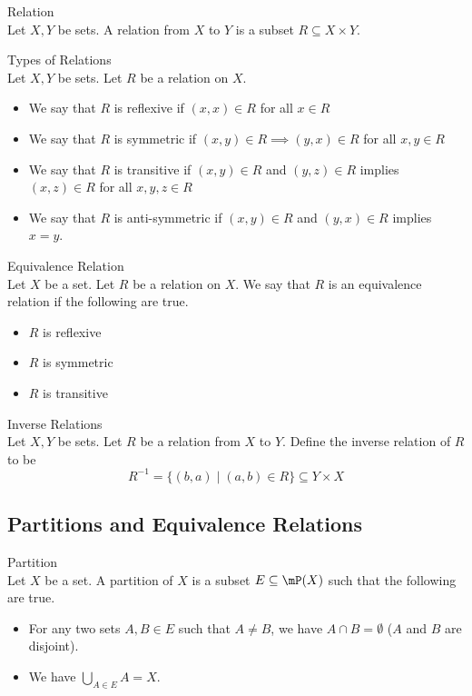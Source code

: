 \documentclass[a4paper]{article}
\begin{document}
\begin{defn}{Relation}{}\\
Let $X,Y$ be sets. A relation from $X$ to $Y$ is a subset $R\subseteq X\times Y$. 
\end{defn}

\begin{defn}{Types of Relations}{}\\
Let $X,Y$ be sets. Let $R$ be a relation on $X$. 
\begin{itemize}
\item We say that $R$ is reflexive if $(x,x)\in R$ for all $x\in R$
\item We say that $R$ is symmetric if $(x,y)\in R\implies (y,x)\in R$ for all $x,y\in R$
\item We say that $R$ is transitive if $(x,y)\in R$ and $(y,z)\in R$ implies $(x,z)\in R$ for all $x,y,z\in R$
\item We say that $R$ is anti-symmetric if $(x,y)\in R$ and $(y,x)\in R$ implies $x=y$. 
\end{itemize}
\end{defn}

\begin{defn}{Equivalence Relation}{}\\
Let $X$ be a set. Let $R$ be a relation on $X$. We say that $R$ is an equivalence relation if the following are true. 
\begin{itemize}
\item $R$ is reflexive
\item $R$ is symmetric
\item $R$ is transitive
\end{itemize}
\end{defn}

\begin{defn}{Inverse Relations}{}\\
Let $X,Y$ be sets. Let $R$ be a relation from $X$ to $Y$. Define the inverse relation of $R$ to be $$R^{-1}=\{(b,a)\;|\;(a,b)\in R\}\subseteq Y\times X$$
\end{defn}

\subsection{Partitions and Equivalence Relations}
\begin{defn}{Partition}{}\\
Let $X$ be a set. A partition of $X$ is a subset $E\subseteq\mP(X)$ such that the following are true. 
\begin{itemize}
\item For any two sets $A,B\in E$ such that $A\neq B$, we have $A\cap B=\emptyset$ ($A$ and $B$ are disjoint). 
\item We have $\bigcup_{A\in E}A=X$. 
\end{itemize}
\end{defn}
\end{document}
